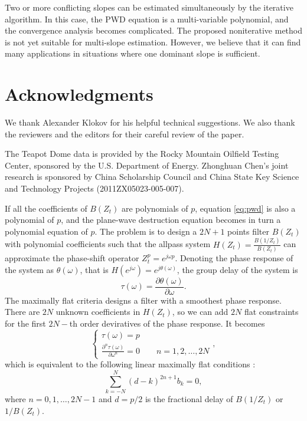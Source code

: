 Two or more conflicting slopes can be estimated simultaneously by the iterative algorithm.
In this case, the PWD equation is a multi-variable polynomial,
and the convergence analysis becomes complicated.
The proposed noniterative method is not yet suitable for multi-slope estimation.
However, we believe that it can find many applications in situations 
where one dominant slope is sufficient.


\section*{Acknowledgments}

We thank Alexander Klokov for his helpful technical suggestions.
We also thank the reviewers and the editors for 
their careful review of the paper.

The Teapot Dome data is provided by the Rocky Mountain Oilfield Testing Center,
sponsored by the U.S. Department of Energy.
Zhonghuan Chen's joint research is sponsored by China Scholarship Council
and China State Key Science and Technology Projects (2011ZX05023-005-007).


If all the coefficients of $B(Z_t)$ are polynomials of $p$,
equation \ref{eq:pwd} is also a polynomial of $p$,
and the plane-wave destruction equation becomes 
in turn a polynomial equation of $p$.
The problem is to design a $2N+1$ points filter $B(Z_t)$ 
with polynomial coefficients
such that the allpass system $H(Z_t)=\frac{B(1/Z_t)}{B(Z_t)}$ can approximate 
the phase-shift operator $Z_t^p=e^{j\omega p}$.
Denoting the phase response of the system as $\theta(\omega)$,
that is $H(e^{j\omega})=e^{j\theta(\omega)}$,
the group delay of the system is
\begin{equation}
\tau(\omega)=\frac{\partial \theta(\omega)}{\partial \omega}.
\end{equation}
The maximally flat criteria designs a filter 
with a smoothest phase response. 
There are $2N$ unknown coefficients in $H(Z_t)$,
so we can add $2N$ flat constraints for the first $2N-$th order deviratives
of the phase response. 
It becomes
\cite[~equation 7]{zhang2009maxflat}
\begin{equation}
\left\{\begin{array}{l}
\tau(\omega)=p \\
\displaystyle{\frac{\partial^n\tau(\omega)}{\partial \omega^n}}=0
\qquad n=1,2,\dots,2N
\end{array}\right.,
\end{equation}
which is equivalent to the following linear maximally flat conditions
\cite[]{thiran1971recursive}:
\begin{equation}\label{eq:mf:cond}
\sum_{k=-N}^N (d-k)^{2n+1}b_k =0,
\end{equation}
where $n=0,1,\dots,2N-1$ and 
$d=p/2$ is the fractional delay of $B(1/Z_t)$ or $1/B(Z_t)$.

